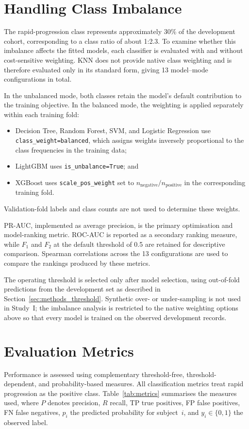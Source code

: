 \section{Handling Class Imbalance}
\label{sec:methods_imbalance}
The rapid-progression class represents approximately 30\% of the development cohort, corresponding to a class ratio of about 1:2.3. To examine whether this imbalance affects the fitted models, each classifier is evaluated with and without cost-sensitive weighting. \gls{KNN} does not provide native class weighting and is therefore evaluated only in its standard form, giving 13 model--mode configurations in total.

In the unbalanced mode, both classes retain the model's default contribution to the training objective. In the balanced mode, the weighting is applied separately within each training fold:
\begin{itemize}
  \item Decision Tree, Random Forest, \gls{SVM}, and Logistic Regression use \texttt{class\_weight=balanced}, which assigns weights inversely proportional to the class frequencies in the training data;
  \item LightGBM uses \texttt{is\_unbalance=True}; and
  \item XGBoost uses \texttt{scale\_pos\_weight} set to $n_{\mathrm{negative}}/n_{\mathrm{positive}}$ in the corresponding training fold.
\end{itemize}
Validation-fold labels and class counts are not used to determine these weights.

\gls{PR-AUC}, implemented as average precision, is the primary optimisation and model-ranking metric. \gls{ROC-AUC} is reported as a secondary ranking measure, while $F_1$ and $F_2$ at the default threshold of 0.5 are retained for descriptive comparison. Spearman correlations across the 13 configurations are used to compare the rankings produced by these metrics.

The operating threshold is selected only after model selection, using out-of-fold predictions from the development set as described in Section~\ref{sec:methods_threshold}. Synthetic over- or under-sampling is not used in Study~I; the imbalance analysis is restricted to the native weighting options above so that every model is trained on the observed development records.

\section{Evaluation Metrics}
\label{sec:methods_metrics}
Performance is assessed using complementary threshold-free, threshold-dependent, and probability-based measures. All classification metrics treat rapid progression as the positive class. Table~\ref{tab:metrics} summarises the measures used, where $P$ denotes precision, $R$ recall, TP true positives, FP false positives, FN false negatives, $p_i$ the predicted probability for subject~$i$, and $y_i \in \{0,1\}$ the observed label.

